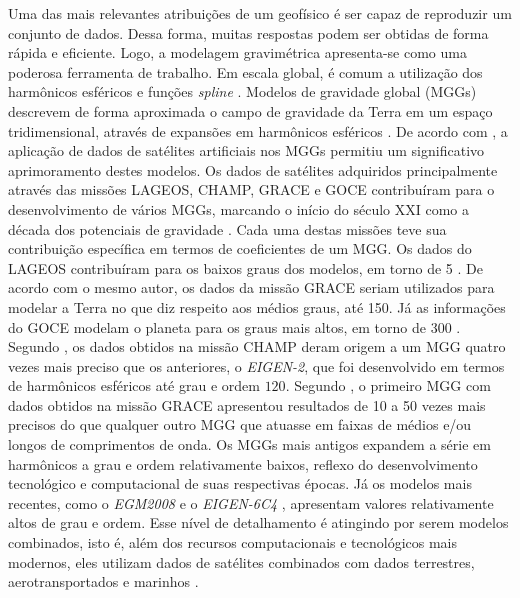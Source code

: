Uma das mais relevantes atribuições de um geofísico é ser capaz de reproduzir um conjunto de dados. Dessa forma, muitas respostas podem ser obtidas de forma rápida e eficiente. Logo, a modelagem gravimétrica apresenta-se como uma poderosa ferramenta de trabalho. Em escala global, é comum a utilização dos harmônicos esféricos e funções \textit{spline} \cite{sandwell1987biharmonic}. Modelos de gravidade global (MGGs) descrevem de forma aproximada o campo de gravidade da Terra em um espaço tridimensional, através de expansões em harmônicos esféricos \cite{barthelmes2009}. De acordo com , a aplicação de dados de satélites artificiais nos MGGs permitiu um significativo aprimoramento destes modelos. Os dados de satélites adquiridos principalmente através das missões LAGEOS, CHAMP, GRACE e GOCE contribuíram para o desenvolvimento de vários MGGs, marcando o início do século XXI como a década dos potenciais de gravidade \cite{barthelmes2014global,junior2019evoluccao}. Cada uma destas missões teve sua contribuição específica em termos de coeficientes de um MGG. Os dados do LAGEOS contribuíram para os baixos graus dos modelos, em torno de 5 \cite{torge2001geodesy}. De acordo com o mesmo autor, os dados da missão GRACE seriam utilizados para modelar a Terra no que diz respeito aos médios graus, até 150. Já as informações do GOCE modelam o planeta para os graus mais altos, em torno de 300 \cite{torge2001geodesy,forste2016}. Segundo , os dados obtidos na missão CHAMP deram origem a um MGG quatro vezes mais preciso que os anteriores, o \textit{EIGEN-2}, que foi desenvolvido em termos de harmônicos esféricos até grau e ordem $120$. Segundo , o primeiro MGG  com dados obtidos na missão GRACE apresentou resultados de 10 a 50 vezes mais precisos do que qualquer outro  MGG que atuasse em faixas de médios e/ou longos de comprimentos de onda. Os MGGs mais antigos expandem a série em harmônicos a grau e ordem  relativamente baixos, reflexo do desenvolvimento tecnológico e computacional de suas respectivas épocas. Já os modelos mais recentes, como o \textit{EGM2008} e o \textit{EIGEN-6C4} , apresentam valores relativamente altos de grau e ordem. Esse nível de detalhamento é atingindo por serem modelos combinados, isto é, além dos recursos computacionais e tecnológicos mais modernos, eles utilizam dados de satélites combinados com dados terrestres, aerotransportados e marinhos \cite{eigen,barbosagravimetria}.

